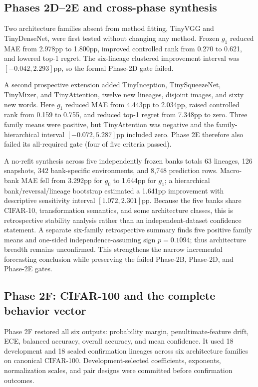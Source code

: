 \documentclass[11pt,a4paper]{article}
\begin{document}
\subsection{Phases 2D--2E and cross-phase synthesis}

Two architecture families absent from method fitting, TinyVGG and TinyDenseNet,
were first tested without changing any method.  Frozen $g_1$ reduced MAE from
2.978pp to 1.800pp, improved controlled rank from 0.270 to 0.621, and lowered
top-1 regret.  The six-lineage clustered improvement interval was
$[-0.042,2.293]$pp, so the formal Phase-2D gate failed.

A second prospective extension added TinyInception, TinySqueezeNet, TinyMixer,
and TinyAttention, twelve new lineages, disjoint images, and sixty new words.
Here $g_1$ reduced MAE from 4.443pp to 2.034pp, raised controlled rank from
0.159 to 0.755, and reduced top-1 regret from 7.348pp to zero.  Three family
means were positive, but TinyAttention was negative and the family-hierarchical
interval $[-0.072,5.287]$pp included zero.  Phase 2E therefore also failed its
all-required gate (four of five criteria passed).

A no-refit synthesis across five independently frozen banks totals 63
lineages, 126 snapshots, 342 bank-specific environments, and 8,748 prediction
rows.  Macro-bank MAE fell from 3.292pp for $g_0$ to 1.644pp for $g_1$; a
hierarchical bank/reversal/lineage bootstrap estimated a 1.641pp improvement
with descriptive sensitivity interval $[1.072,2.301]$pp.  Because the five
banks share CIFAR-10, transformation semantics, and some architecture classes,
this is retrospective stability analysis rather than an independent-dataset
confidence statement.  A separate six-family retrospective summary finds five
positive family means and one-sided independence-assuming sign $p=0.1094$;
thus architecture breadth remains unconfirmed.  This strengthens the narrow
incremental forecasting conclusion while preserving the failed Phase-2B,
Phase-2D, and Phase-2E gates.

\subsection{Phase 2F: CIFAR-100 and the complete behavior vector}

Phase 2F restored all six outputs: probability margin, penultimate-feature
drift, ECE, balanced accuracy, overall accuracy, and mean confidence.  It used
18 development and 18 sealed confirmation lineages across six architecture
families on canonical CIFAR-100.  Development-selected coefficients,
exponents, normalization scales, and pair designs were committed before
confirmation outcomes.
\end{document}
